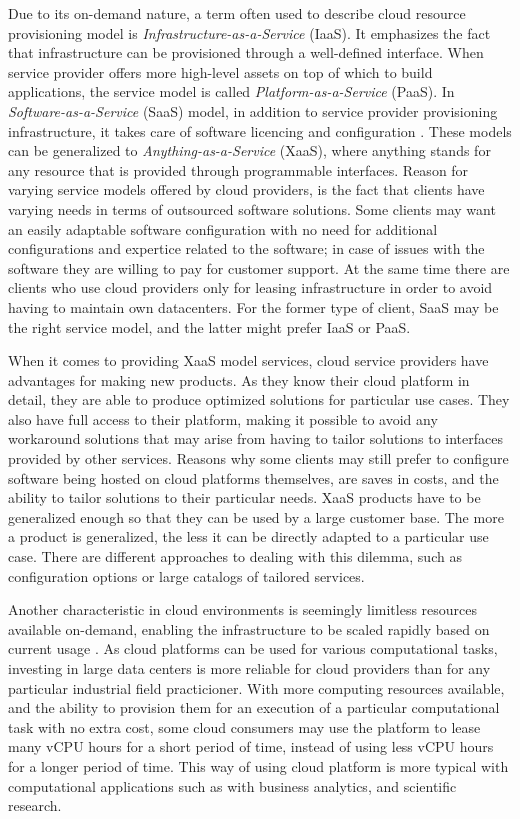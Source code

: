 Due to its on-demand nature, a term often used to describe cloud resource
provisioning model is \textit{Infrastructure-as-a-Service} (IaaS). It
emphasizes the fact that infrastructure can be provisioned through a
well-defined interface. When service provider offers more high-level assets on
top of which to build applications, the service model is called
\textit{Platform-as-a-Service} (PaaS). In \textit{Software-as-a-Service} (SaaS)
model, in addition to service provider provisioning infrastructure, it takes
care of software licencing and configuration \cite{sefraoui2012openstack}.
These models can be generalized to \textit{Anything-as-a-Service} (XaaS), where
anything stands for any resource that is provided through programmable
interfaces. Reason for varying service models offered by cloud providers, is
the fact that clients have varying needs in terms of outsourced software
solutions. Some clients may want an easily adaptable software configuration
with no need for additional configurations and expertice related to the
software; in case of issues with the software they are willing to pay for
customer support. At the same time there are clients who use cloud providers
only for leasing infrastructure in order to avoid having to maintain own
datacenters. For the former type of client, SaaS may be the right service
model, and the latter might prefer IaaS or PaaS.

When it comes to providing XaaS model services, cloud service providers have
advantages for making new products. As they know their cloud platform in
detail, they are able to produce optimized solutions for particular use cases.
They also have full access to their platform, making it possible to avoid any
workaround solutions that may arise from having to tailor solutions to
interfaces provided by other services. Reasons why some clients may still
prefer to configure software being hosted on cloud platforms themselves, are
saves in costs, and the ability to tailor solutions to their particular needs.
XaaS products have to be generalized enough so that they can be used by a large
customer base. The more a product is generalized, the less it can be directly
adapted to a particular use case. There are different approaches to dealing
with this dilemma, such as configuration options or large catalogs of tailored
services.

Another characteristic in cloud environments is seemingly limitless resources
available on-demand, enabling the infrastructure to be scaled rapidly based on
current usage \cite{armbrust2010view}. As cloud platforms can be used for
various computational tasks, investing in large data centers is more reliable
for cloud providers than for any particular industrial field practicioner. With
more computing resources available, and the ability to provision them for an
execution of a particular computational task with no extra cost, some cloud
consumers may use the platform to lease many vCPU hours for a short period of
time, instead of using less vCPU hours for a longer period of time. This way of
using cloud platform is more typical with computational applications such as
with business analytics, and scientific research.

